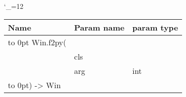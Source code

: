 \begingroup \catcode`\_=12 \tt
\begin{tabular}{lll}
\toprule
\textrm{Name}&\textrm{Param name}&\textrm{param type}\\
\midrule
\hbox to 0pt {Win.f2py(\hss}\\
& cls\\
& arg & int\\
\hbox to 0pt{) -> Win\hss}\\
\bottomrule
\end{tabular}
\endgroup
